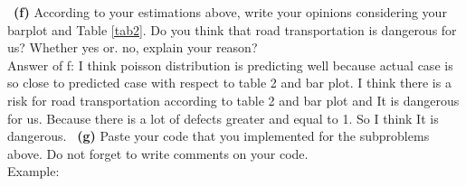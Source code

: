 \documentclass[a4 paper]{article}
\numberwithin{equation}{section}
\newcommand{\subproblem}[1]{~\newline\textbf{(#1)}}
\newcommand{\0}{\mathbf{0}}
\begin{document}
	\subproblem{f} According to your estimations above, write your opinions considering your barplot and Table \ref{tab2}. Do you think that road transportation is dangerous for us? Whether yes or. no, explain your reason?\\
	\newline 
	\newline
	Answer of f:
	\newline
	I think poisson distribution is predicting well because actual case is so close to predicted case with respect to table 2 and bar plot. I think there is a risk for road transportation according to table 2 and bar plot and It is
	dangerous for us. Because there is a lot of defects greater and equal to 1. So I think It is dangerous.
	\newline
	\subproblem{g} Paste your code that you implemented for the subproblems above. Do not forget to write comments on your code.\\
	Example:\\
\end{document}
